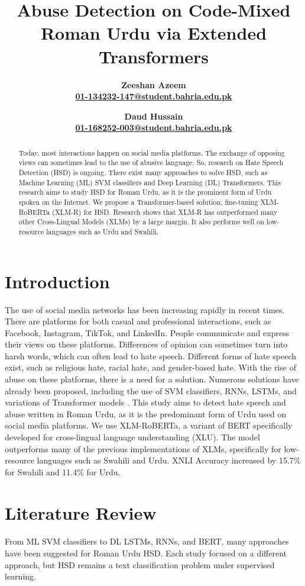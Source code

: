 \documentclass[11pt, a4paper]{article}
\title{Abuse Detection on Code-Mixed Roman Urdu via Extended Transformers}
\author{\bf Zeeshan Azeem \\ \href{mailto:01-134232-147@student.bahria.edu.pk} {01-134232-147@student.bahria.edu.pk}
\and \bf Daud Hussain \\ \href{mailto:01-168252-003@student.bahria.edu.pk} {01-168252-003@student.bahria.edu.pk}}
\begin{document}
\maketitle
\begin{abstract}
Today, most interactions happen on social media platforms. The exchange of opposing views can sometimes lead to the use of abusive language. So, research on Hate Speech Detection (HSD) is ongoing. There exist many approaches to solve HSD, such as Machine Learning (ML) SVM classifiers and Deep Learning (DL) Transformers. This research aims to study HSD for Roman Urdu, as it is the prominent form of Urdu spoken on the Internet. We propose a Transformer-based solution, fine-tuning XLM-RoBERTa (XLM-R) for HSD. Research shows that XLM-R has outperformed many other Cross-Lingual Models (XLMs) by a large margin. It also performs well on low-resource languages such as Urdu and Swahili.
\end{abstract}
\section{Introduction}
The use of social media networks has been increasing rapidly in recent times. There are platforms for both casual and professional interactions, such as Facebook, Instagram, TikTok, and LinkedIn. People communicate and express their views on these platforms. Differences of opinion can sometimes turn into harsh words, which can often lead to hate speech\cite{onlinehate}. Different forms of hate speech exist, such as religious hate, racial hate, and gender-based hate\cite{socialmediaonlinehate}. With the rise of abuse on these platforms, there is a need for a solution. Numerous solutions have already been proposed, including the use of SVM classifiers, RNNs, LSTMs, and variations of Transformer models \cite{bilaletal}\cite{ashiqetal}. This study aims to detect hate speech and abuse written in Roman Urdu, as it is the predominant form of Urdu used on social media platforms. We use XLM-RoBERTa, a variant of BERT specifically developed for cross-lingual language understanding (XLU). The model outperforms many of the previous implementations of XLMs, specifically for low-resource languages such as Swahili and Urdu. XNLI Accuracy increased by 15.7\% for Swahili and 11.4\% for Urdu\cite{xlmrobertaresults}.
\section{Literature Review}
\paragraph{}
From ML SVM classifiers to DL LSTMs, RNNs, and BERT, many approaches have been suggested for Roman Urdu HSD. Each study focused on a different approach, but HSD remains a text classification problem  under supervised learning.
\end{document}
